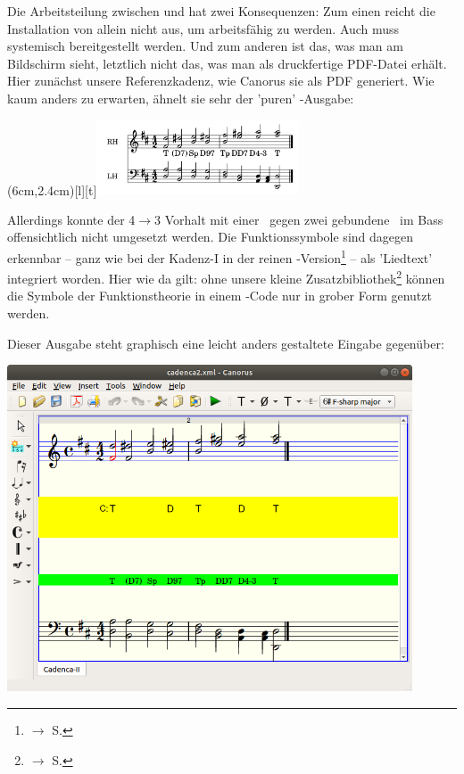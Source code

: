 Die Arbeitsteilung zwischen  und  hat zwei
Konsequenzen: Zum einen reicht die Installation von  allein nicht
aus, um arbeitsfähig zu werden. Auch   muss systemisch
bereitgestellt werden. Und zum anderen ist das, was man am Bildschirm sieht,
letztlich nicht das, was man als druckfertige PDF-Datei erhält. Hier zunächst
unsere Referenzkadenz, wie Canorus sie als PDF generiert. Wie kaum anders zu
erwarten, ähnelt sie sehr der 'puren' -Ausgabe:


\parpic(6cm,2.4cm)[l][t]{\includegraphics[width=6cm]{frontends/canorus/cadenca2-pdf-300dpi.png}}

Allerdings konnte der 4$\rightarrow$3 Vorhalt mit einer \Halb\ gegen zwei
gebundene \Vier\ im Bass offensichtlich nicht umgesetzt werden. Die
Funktionssymbole sind dagegen erkennbar -- ganz wie bei der Kadenz-I in der
reinen -Version\footnote{$\rightarrow$ S.
\pageref{LilyPondKadenzI}} -- als 'Liedtext' integriert worden. Hier wie da
gilt: ohne unsere kleine Zusatzbibliothek\footnote{$\rightarrow$ S.
\pageref{LilyPondFuncTheory}} können die Symbole der Funktionstheorie in einem
-Code nur in grober Form genutzt werden.

Dieser Ausgabe steht graphisch eine leicht anders gestaltete Eingabe gegenüber:
\begin{center}
\includegraphics[width=0.9\textwidth]{frontends/canorus/cadenca2-canorus.png}
\end{center}

